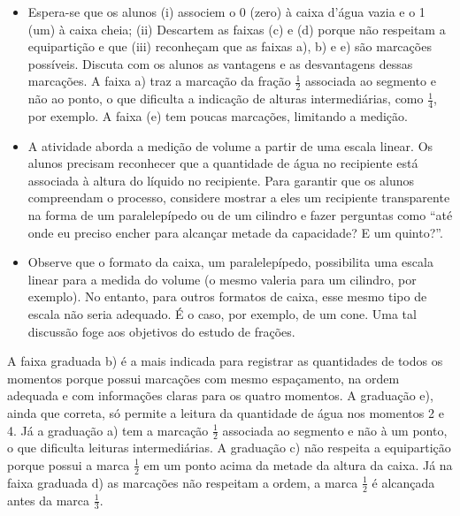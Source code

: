 \begin{multicols}{2}
\begin{orientacoes}{}{}
\begin{itemize} %
\item Espera-se que os alunos (i) associem o 0 (zero) à caixa d'água vazia e o 1 (um) à caixa cheia; (ii) Descartem as faixas (c) e (d) porque não respeitam a equipartição e que (iii) reconheçam que as faixas a), b) e e) são marcações possíveis. Discuta com os alunos as vantagens e as desvantagens dessas marcações. A faixa a) traz a marcação da fração $\frac{1}{2}$ associada ao segmento e não ao ponto, o que dificulta a indicação de alturas intermediárias, como $\frac{1}{4}$, por exemplo. A faixa (e) tem poucas marcações, limitando a medição.
\item A atividade aborda a medição de volume a partir de uma escala linear. Os alunos precisam reconhecer que a quantidade de água no recipiente está associada à altura do líquido no recipiente. Para garantir que os alunos compreendam o processo, considere mostrar a eles um recipiente transparente na forma de um paralelepípedo ou de um cilindro e fazer perguntas como ``até onde eu preciso encher para alcançar metade da capacidade? E um quinto?''.
\item Observe que o formato da caixa, um paralelepípedo, possibilita uma escala linear para a medida do volume (o mesmo valeria para um cilindro, por exemplo). No entanto, para outros formatos de caixa, esse mesmo tipo de escala não seria adequado. É o caso, por exemplo, de um cone. Uma tal discussão foge aos objetivos do estudo de frações.
\end{itemize} %
\end{orientacoes}

\begin{solucao}[code={\setcounter{tcb@cnt@solucao}{0}}]{}{}
  A faixa graduada b) é a mais indicada para registrar as quantidades de todos os momentos porque possui marcações com mesmo espaçamento, na ordem adequada e com informações claras para os quatro momentos. A graduação e), ainda que correta, só permite a leitura da quantidade de água nos momentos 2 e 4. Já a graduação a) tem a marcação $\frac{1}{2}$ associada ao segmento e não à um ponto, o que dificulta leituras intermediárias. A graduação c) não respeita a equipartição porque possui a marca $\frac{1}{2}$ em um ponto acima da metade da altura da caixa. Já na faixa graduada d) as marcações não respeitam a ordem, a marca $\frac{1}{2}$ é alcançada antes da marca $\frac{1}{3}$. 
\end{solucao}


\end{multicols}

